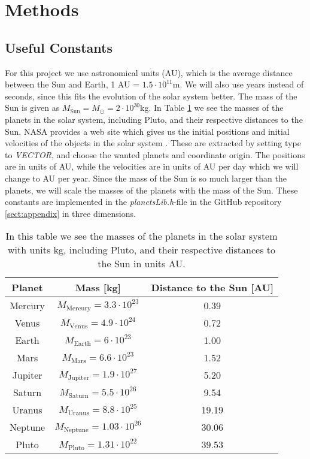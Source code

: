 \documentclass[12pt,a4paper,english]{article}
\begin{document}
\section{Methods}
\label{sect:Method}
\subsection{Useful Constants}
\label{subsect:constants}
For this project we use astronomical units (AU), which is the average distance between the Sun and Earth, 1 AU = $1.5\cdot10^{11}$m. We will also use years instead of seconds, since this fits the evolution of the solar system better. The mass of the Sun is given as $M_{\text{Sun}}=M_{\odot}=2\cdot10^{30}$kg. In Table \ref{tab:planets} we see the masses of the planets in the solar system, including Pluto, and their respective distances to the Sun. NASA provides a web site which gives us the initial positions and initial velocities of the objects in the solar system \cite{horizon}. These are extracted by setting type to \textit{VECTOR}, and choose the wanted planets and coordinate origin. The positions are in units of AU, while the velocities are in units of AU per day which we will change to AU per year. Since the mass of the Sun is so much larger than the planets, we will scale the masses of the planets with the mass of the Sun. These constants are implemented in the \textit{planetsLib.h}-file in the GitHub repository \ref{sect:appendix} in three dimensions.

\begin{table}[htbp]
	\centering
	\begin{tabular}{ |c|c|c| }
		\hline \rule{0pt}{13pt}
		Planet & Mass [kg] & Distance to the Sun [AU] \\
		\hline \rule{0pt}{13pt}
		Mercury & $M_{\text{Mercury}}=3.3\cdot10^{23}$ & 0.39  \\
		\hline \rule{0pt}{13pt}
		Venus & $M_{\text{Venus}}=4.9\cdot10^{24}$ & 0.72 \\
		\hline \rule{0pt}{13pt}
		Earth & $M_{\text{Earth}}=6\cdot10^{23}$ & 1.00 \\
		\hline \rule{0pt}{13pt}
		Mars & $M_{\text{Mars}}=6.6\cdot10^{23}$ & 1.52 \\
		\hline \rule{0pt}{13pt}
		Jupiter & $M_{\text{Jupiter}}=1.9\cdot10^{27}$ & 5.20 \\
		\hline \rule{0pt}{13pt}
		Saturn & $M_{\text{Saturn}}=5.5\cdot10^{26}$ & 9.54 \\
		\hline \rule{0pt}{13pt}
		Uranus & $M_{\text{Uranus}}=8.8\cdot10^{25}$ & 19.19 \\
		\hline \rule{0pt}{13pt}
		Neptune & $M_{\text{Neptune}}=1.03\cdot10^{26}$ & 30.06 \\
		\hline \rule{0pt}{13pt}
		Pluto & $M_{\text{Pluto}}=1.31\cdot10^{22}$ & 39.53 \\
		\hline 
	\end{tabular}	
	\caption{In this table we see the masses of the planets in the solar system with units kg, including Pluto, and their respective distances to the Sun in units AU.}
	\label{tab:planets}
\end{table}
\end{document}
